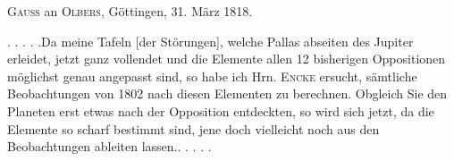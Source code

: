 \par{}\bigskip
\begin{center}
\textsc{Gauss} an \textsc{Olbers}, Göttingen, 31. März 1818.
\end{center}
\noindent\hspace*{\parindent}. . . . .\quad Da meine Tafeln [der Störungen], welche Pallas abseiten des Jupiter erleidet, jetzt ganz vollendet und die Elemente allen 12 bisherigen Oppositionen möglichst genau angepasst sind, so habe ich Hrn. \textsc{Encke} ersucht, sämtliche Beobachtungen von 1802 nach diesen Elementen zu berechnen. Obgleich Sie den Planeten erst etwas nach der Opposition entdeckten, so wird sich jetzt, da die Elemente so scharf bestimmt sind, jene doch vielleicht noch aus den Beobachtungen ableiten lassen.\quad . . . . .
\par
